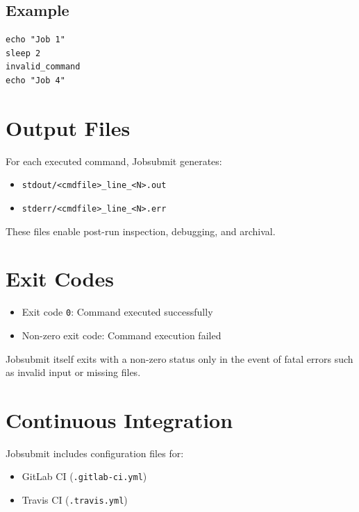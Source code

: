 \documentclass[12pt,a4paper]{article}
\begin{document}
\subsection{Example}

\begin{lstlisting}
echo "Job 1"
sleep 2
invalid_command
echo "Job 4"
\end{lstlisting}

\section{Output Files}

For each executed command, Jobsubmit generates:

\begin{itemize}
    \item \texttt{stdout/<cmdfile>\_line\_<N>.out}
    \item \texttt{stderr/<cmdfile>\_line\_<N>.err}
\end{itemize}

These files enable post-run inspection, debugging, and archival.

\section{Exit Codes}

\begin{itemize}
    \item Exit code \texttt{0}: Command executed successfully
    \item Non-zero exit code: Command execution failed
\end{itemize}

Jobsubmit itself exits with a non-zero status only in the event of fatal errors such as invalid input or missing files.

\section{Continuous Integration}

Jobsubmit includes configuration files for:

\begin{itemize}
    \item GitLab CI (\texttt{.gitlab-ci.yml})
    \item Travis CI (\texttt{.travis.yml})
\end{itemize}
\end{document}

